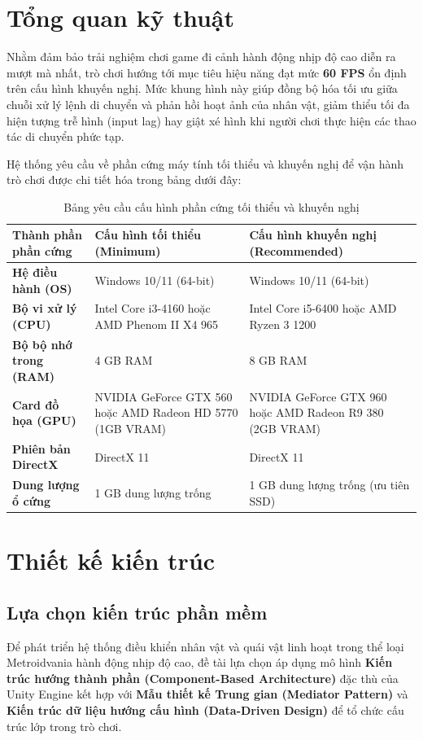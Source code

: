 \documentclass[../DoAn.tex]{subfiles}
\begin{document}
\section{Tổng quan kỹ thuật}
\label{section:5.1}
 Nhằm đảm bảo trải nghiệm chơi game đi cảnh hành động nhịp độ cao diễn ra mượt mà nhất, trò chơi hướng tới mục tiêu hiệu năng đạt mức \textbf{60 FPS} ổn định trên cấu hình khuyến nghị. Mức khung hình này giúp đồng bộ hóa tối ưu giữa chuỗi xử lý lệnh di chuyển và phản hồi hoạt ảnh của nhân vật, giảm thiểu tối đa hiện tượng trễ hình (input lag) hay giật xé hình khi người chơi thực hiện các thao tác di chuyển phức tạp.

Hệ thống yêu cầu về phần cứng máy tính tối thiểu và khuyến nghị để vận hành trò chơi được chi tiết hóa trong bảng dưới đây:

\begin{table}[H]
\centering
\begin{tabular}{|p{3.0cm}|p{4.5cm}|p{5.0cm}|}
\hline
\textbf{Thành phần phần cứng} & \textbf{Cấu hình tối thiểu (Minimum)} & \textbf{Cấu hình khuyến nghị (Recommended)} \\ \hline
\textbf{Hệ điều hành (OS)} & Windows 10/11 (64-bit) & Windows 10/11 (64-bit) \\ \hline
\textbf{Bộ vi xử lý (CPU)} & Intel Core i3-4160 hoặc AMD Phenom II X4 965 & Intel Core i5-6400 hoặc AMD Ryzen 3 1200 \\ \hline
\textbf{Bộ bộ nhớ trong (RAM)} & 4 GB RAM & 8 GB RAM \\ \hline
\textbf{Card đồ họa (GPU)} & NVIDIA GeForce GTX 560 hoặc AMD Radeon HD 5770 (1GB VRAM) & NVIDIA GeForce GTX 960 hoặc AMD Radeon R9 380 (2GB VRAM) \\ \hline
\textbf{Phiên bản DirectX} & DirectX 11 & DirectX 11 \\ \hline
\textbf{Dung lượng ổ cứng} & 1 GB dung lượng trống & 1 GB dung lượng trống (ưu tiên SSD) \\ \hline
\end{tabular}
\caption{Bảng yêu cầu cấu hình phần cứng tối thiểu và khuyến nghị}
\label{table:hardware_requirements}
\end{table}


\section{Thiết kế kiến trúc}
\label{section:5.2}

\subsection{Lựa chọn kiến trúc phần mềm}
\label{subsection:5.2.1}
Để phát triển hệ thống điều khiển nhân vật và quái vật linh hoạt trong thể loại Metroidvania hành động nhịp độ cao, đề tài lựa chọn áp dụng mô hình \textbf{Kiến trúc hướng thành phần (Component-Based Architecture)} đặc thù của Unity Engine kết hợp với \textbf{Mẫu thiết kế Trung gian (Mediator Pattern)} và \textbf{Kiến trúc dữ liệu hướng cấu hình (Data-Driven Design)} để tổ chức cấu trúc lớp trong trò chơi.
\end{document}
